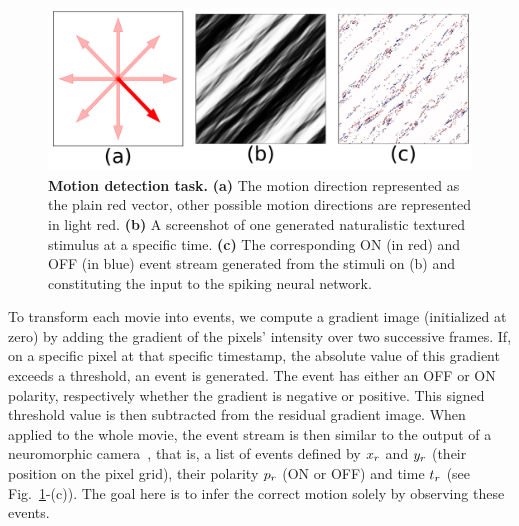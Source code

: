 \documentclass[default]{sn-jnl}%
\theoremstyle{thmstyleone}%
\theoremstyle{thmstyletwo}%
\theoremstyle{thmstylethree}%
\newcommand{\seeFig}[1]{see Fig.~\ref{fig:#1}}%
\begin{document}
%
\begin{figure}[h!]%
    \centering
    \includegraphics[width=0.95\linewidth]{figures/motionclouds.pdf}
    \caption{{\bf Motion detection task.} {\bf (a)} The motion direction represented as the plain red vector, other possible motion directions are represented in light red. {\bf (b)} A screenshot of one generated naturalistic textured stimulus at a specific time. %
    {\bf (c)} The corresponding ON (in red) and OFF (in blue) event stream generated from the stimuli on (b) and constituting the input to the spiking neural network.}
    \label{fig:motionclouds}
\end{figure}


To transform each movie into events, we compute a gradient image (initialized at zero) by adding the gradient of the pixels' intensity over two successive frames. If, on a specific pixel at that specific timestamp, the absolute value of this gradient exceeds a threshold, an event is generated. The event has either an OFF or ON polarity, respectively whether the gradient is negative or positive. This signed threshold value is then subtracted from the residual gradient image. When applied to the whole movie, the event stream is then similar to the output of a neuromorphic camera~\cite{Rasetto2022}, that is, a list of events defined by $x_r$ and $y_r$ (their position on the pixel grid), their polarity $p_r$ (ON or OFF) and time $t_r$  (\seeFig{motionclouds}-(c)). The goal here is to infer the correct motion solely by observing these events.
\end{document}

